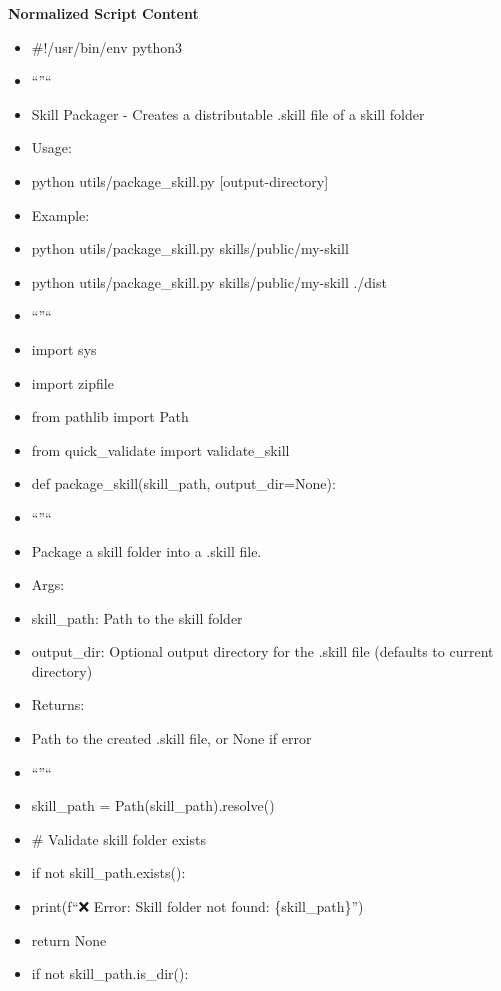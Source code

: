 \documentclass[11pt]{article}
\begin{document}
\textbf{Normalized Script Content}
\begin{itemize}[leftmargin=*,itemsep=2pt,topsep=2pt]
\item {} \#!/usr/bin/env python3
\item {} ``''``
\item {} Skill Packager - Creates a distributable .skill file of a skill folder
\item {} Usage:
\item {} python utils/package\_\allowbreak{}skill.py [output-directory]
\item {} Example:
\item {} python utils/package\_\allowbreak{}skill.py skills/public/my-skill
\item {} python utils/package\_\allowbreak{}skill.py skills/public/my-skill ./dist
\item {} ``''``
\item {} import sys
\item {} import zipfile
\item {} from pathlib import Path
\item {} from quick\_\allowbreak{}validate import validate\_\allowbreak{}skill
\item {} def package\_\allowbreak{}skill(skill\_\allowbreak{}path, output\_\allowbreak{}dir=None):
\item {} ``''``
\item {} Package a skill folder into a .skill file.
\item {} Args:
\item {} skill\_\allowbreak{}path: Path to the skill folder
\item {} output\_\allowbreak{}dir: Optional output directory for the .skill file (defaults to current directory)
\item {} Returns:
\item {} Path to the created .skill file, or None if error
\item {} ``''``
\item {} skill\_\allowbreak{}path = Path(skill\_\allowbreak{}path).resolve()
\item {} \# Validate skill folder exists
\item {} if not skill\_\allowbreak{}path.exists():
\item {} print(f``❌ Error: Skill folder not found: \{skill\_\allowbreak{}path\}'')
\item {} return None
\item {} if not skill\_\allowbreak{}path.is\_\allowbreak{}dir():

\end{itemize}
\end{document}
